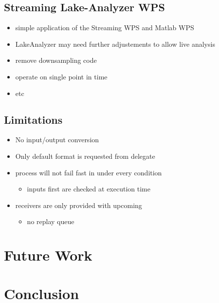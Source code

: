 	\subsection{Streaming Lake-Analyzer WPS}
	\begin{itemize}
		\item simple application of the Streaming WPS and Matlab WPS
		\item LakeAnalyzer may need further adjustements to allow live analysis
		\item remove downsampling code
		\item operate on single point in time
		\item etc
	\end{itemize}
	\subsection{Limitations}
	\begin{itemize}
		\item No input/output conversion
		\item Only default format is requested from delegate
		\item process will not fail fast in under every condition
		\begin{itemize}
			\item inputs first are checked at execution time
		\end{itemize}
		\item receivers are only provided with upcoming
		\begin{itemize}
			\item no replay queue
		\end{itemize}
	\end{itemize}
\section{Future Work}
\section{Conclusion}